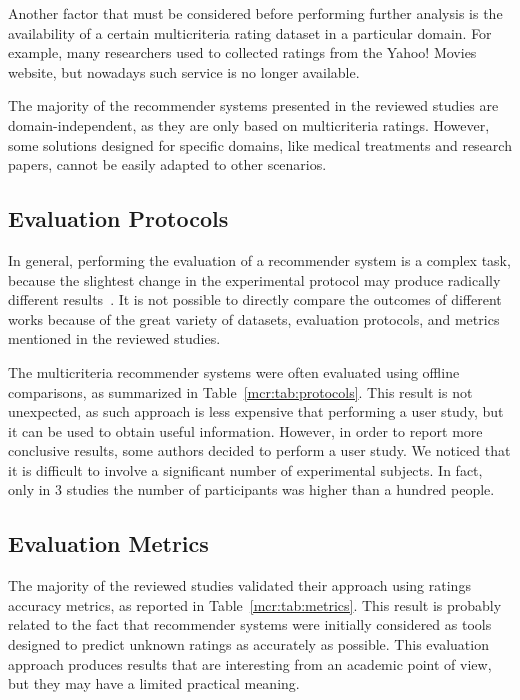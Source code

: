 Another factor that must be considered before performing further analysis is the availability of a certain multicriteria rating dataset in a particular domain. For example, many researchers used to collected ratings from the Yahoo! Movies website, but nowadays such service is no longer available.

The majority of the recommender systems presented in the reviewed studies are domain-independent, as they are only based on multicriteria ratings. However, some solutions designed for specific domains, like medical treatments and research papers, cannot be easily adapted to other scenarios.

\subsection{Evaluation Protocols}

In general, performing the evaluation of a recommender system is a complex task, because the slightest change in the experimental protocol may produce radically different results~\cite{Said2014}. It is not possible to directly compare the outcomes of different works because of the great variety of datasets, evaluation protocols, and metrics mentioned in the reviewed studies.

The multicriteria recommender systems were often evaluated using offline comparisons, as summarized in Table~\ref{mcr:tab:protocols}. This result is not unexpected, as such approach is less expensive that performing a user study, but it can be used to obtain useful information. However, in order to report more conclusive results, some authors decided to perform a user study. We noticed that it is difficult to involve a significant number of experimental subjects. In fact, only in 3 studies the number of participants was higher than a hundred people.

\subsection{Evaluation Metrics}

The majority of the reviewed studies validated their approach using ratings accuracy metrics, as reported in Table~\ref{mcr:tab:metrics}. This result is probably related to the fact that recommender systems were initially considered as tools designed to predict unknown ratings as accurately as possible. This evaluation approach produces results that are interesting from an academic point of view, but they may have a limited practical meaning.

